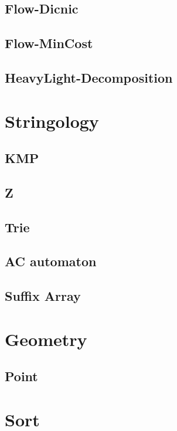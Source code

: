 \documentclass[a4paper,10pt,twocolumn,oneside]{article}
\begin{document}
\subsection{Flow-Dicnic}

\subsection{Flow-MinCost}

\subsection{HeavyLight-Decomposition}

\newpage

\section{Stringology}
\subsection{KMP}

\subsection{Z}

\subsection{Trie}

\subsection{AC automaton}

\subsection{Suffix Array}

\newpage

\section{Geometry}
\subsection{Point}

\newpage

\section{Sort}
\end{document}
